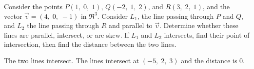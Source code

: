 
\begin{Exercise}[
name={},
title={}, 
difficulty=0,
origin={\cite{MB}}]
Consider the points $P(1,\;0,\;1)$, $Q(-2,\;1,\;2)$, and $R(3,\;2,\;1)$, and the vector $\vec{v}=(4,\;0,\;-1)$ in $\Re^3$.
\Question Consider $L_1$, the line passing through $P$ and $Q$, and $L_2$ the line passing through $R$ and parallel to $\vec{v}$. Determine whether these lines are parallel, intersect, or are skew. 
\Question If $L_1$ and $L_2$ intersects, find their point of intersection, then find the distance between the two lines.
\end{Exercise}
\begin{Answer}
\Question The two lines intersect.
\Question The lines intersect at $(-5,\;2,\;3)$ and the distance is $0$.
\end{Answer}
